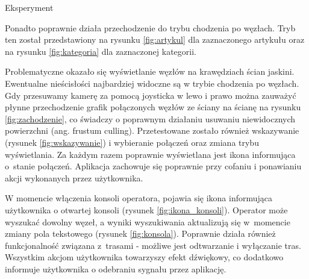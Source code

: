 \begin{chapter}{Eksperyment}


Ponadto poprawnie działa przechodzenie do trybu chodzenia po węzłach. Tryb ten został przedstawiony na rysunku \ref{fig:artykul} dla zaznaczonego artykułu oraz na rysunku \ref{fig:kategoria} dla zaznaczonej kategorii. 



Problematyczne okazało się wyświetlanie węzłów na krawędziach ścian jaskini. Ewentualne nieścisłości najbardziej widoczne są w trybie chodzenia po węzłach. Gdy przesuwamy kamerę za pomocą joysticka w lewo i prawo można zauważyć płynne przechodzenie grafik połączonych węzłów ze ściany na ścianę na rysunku \ref{fig:zachodzenie}, co świadczy o poprawnym działaniu usuwaniu niewidocznych powierzchni (ang. frustum culling). 
Przetestowane zostało również wskazywanie (rysunek \ref{fig:wskazywanie}) i wybieranie połączeń oraz zmiana trybu wyświetlania. Za każdym razem poprawnie wyświetlana jest ikona informująca o~stanie połączeń. Aplikacja zachowuje się poprawnie przy cofaniu i ponawianiu akcji wykonanych przez użytkownika. 



W momencie włączenia konsoli operatora, pojawia się ikona informująca użytkownika o otwartej konsoli (rysunek \ref{fig:ikona_konsoli}). Operator może wyszukać dowolny węzeł, a wyniki wyszukiwania aktualizują się w~momencie zmiany pola tekstowego (rysunek \ref{fig:konsola}). Poprawnie działa również funkcjonalność związana z~trasami - możliwe jest odtwarzanie i wyłączanie tras. Wszystkim akcjom użytkownika towarzyszy efekt dźwiękowy, co dodatkowo informuje użytkownika o odebraniu sygnału przez aplikację.



\end{chapter}
